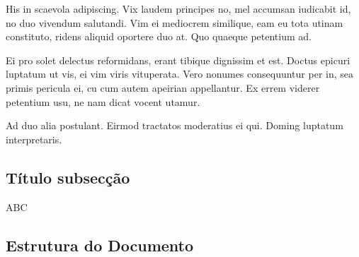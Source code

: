 His in scaevola adipiscing. Vix laudem principes no, mel accumsan iudicabit id, no duo vivendum salutandi. Vim ei mediocrem similique, eam eu tota utinam constituto, ridens aliquid oportere duo at. Quo quaeque petentium ad.

Ei pro solet delectus reformidans, erant tibique dignissim et est. Doctus epicuri luptatum ut vis, ei vim viris vituperata. Vero nonumes consequuntur per in, sea primis pericula ei, cu cum autem apeirian appellantur. Ex errem viderer petentium usu, ne nam dicat vocent utamur.

Ad duo alia postulant. Eirmod tractatos moderatius ei qui. Doming luptatum interpretaris.

\subsection{Título subsecção}

ABC



\subsection{Estrutura do Documento}
